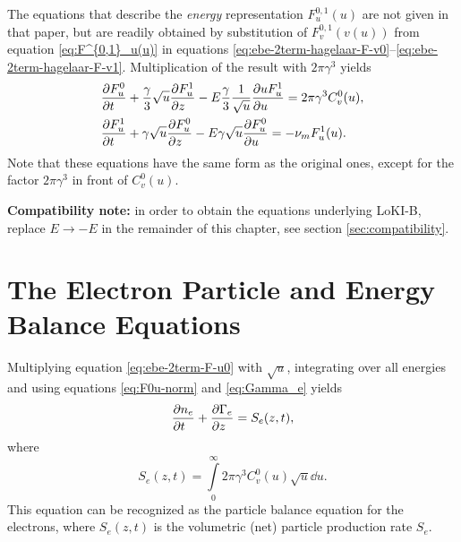 \documentclass{book}
\begin{document}
The equations that describe the {\em energy} representation $F^{0,1}_u(u)$ are not
given in that paper, but are readily obtained by
substitution of $F^{0,1}_v(v(u))$ from equation \eqref{eq:F^{0,1}_u(u)} in equations
\eqref{eq:ebe-2term-hagelaar-F-v0}--\eqref{eq:ebe-2term-hagelaar-F-v1}.
Multiplication of the result with $2\pi\gamma^3$ yields
\begin{align}
	&\PDEV{F^0_u}{t}
	+ \frac{\gamma}{3}\sqrt{u}\PDEV{F^1_u}{z}
	- E\frac{\gamma}{3}\frac{1}{\sqrt{u}}\PDEV{u F^1_u}{u}
	= 2\pi\gamma^3C_v^0(u),
	\label{eq:ebe-2term-F-u0} \\
	&\PDEV{F^1_u}{t}
	+ \gamma \sqrt{u}\PDEV{F^0_u}{z}
	- E\gamma \sqrt{u}\PDEV{F^0_u}{u}
	= -\nu_mF^1_u(u).
	\label{eq:ebe-2term-F-u1}
\end{align}
Note that these equations have the same form as the original ones, except for the
factor $2\pi\gamma^3$ in front of $C_v^0(u)$.

\begin{framed}
	{\bf Compatibility note:}
	in order to obtain the equations underlying LoKI-B, replace $E\rightarrow -E$
	in the remainder of this chapter, see section \ref{sec:compatibility}.
\end{framed}

\section{The Electron Particle and Energy Balance Equations}

Multiplying equation \eqref{eq:ebe-2term-F-u0} with $\sqrt{u}$, integrating over
all energies and using equations \eqref{eq:F0u-norm} and \eqref{eq:Gamma_e} yields
\begin{equation}
	\PDEV{n_e}{t} + \PDEV{\Gamma_e}{z} = S_e(z,t),
	\label{eq:particle-balance}
\end{equation}
where
\begin{equation}
	S_e(z,t) = \int\limits_0^\infty 2\pi\gamma^3C_v^0(u)\sqrt{u}\dd{u}.
\end{equation}
This equation can be recognized as the particle balance equation for the
electrons, where $S_e(z,t)$ is the volumetric (net) particle production rate $S_e$.
\end{document}

